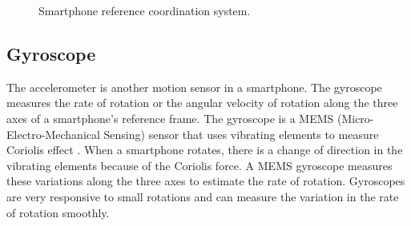 \begin{figure}[!ht]
\centering
{}
\hfill
{}

\caption{Smartphone reference coordination system.}
\label{f:coord_dia}
\end{figure}

\subsection{Gyroscope}
The accelerometer is another motion sensor in a smartphone.
The gyroscope measures the rate of rotation or the angular velocity of rotation along the three axes of a smartphone's reference frame.
The gyroscope is a MEMS (Micro-Electro-Mechanical Sensing) sensor that uses vibrating elements to measure Coriolis effect \cite{coriolis}.
When a smartphone rotates, there is a change of direction in the vibrating elements because of the Coriolis force.
A MEMS gyroscope measures these variations along the three axes to estimate the rate of rotation.
Gyroscopes are very responsive to small rotations and can measure the variation in the rate of rotation smoothly.

